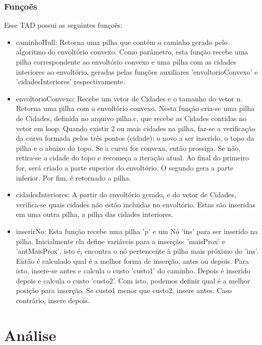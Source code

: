 \documentclass[a4paper,10pt]{article}
\begin{document}
  \subsubsection{Funço\~es}
  Esse TAD possui as seguintes funço\~es:
  
   \begin{itemize}

\item caminhoHull: Retorna uma pilha que contém o caminho gerado pelo algoritmo do envoltório convexo. Como parâmetro, esta função recebe uma pilha correspondente ao envoltório convexo e uma pilha com as cidades interiores ao envoltório, geradas pelas funções auxiliares 'envoltorioConvexo' e 'cidadesInteriores' respectivamente.

\item envoltorioConvexo: Recebe um vetor de Cidades e o tamanho do vetor n. Retorna uma pilha com o envoltório convexo. Nesta função cria-se uma pilha de Cidades, definida no arquivo pilha.c, que recebe as Cidades contidas no vetor em loop. Quando existir 2 ou mais cidades na pilha, faz-se a verificação da curva formada pelos três pontos (cidade): o novo a ser inserido, o topo da pilha e o abaixo do topo. Se a curva for convexa, então prossiga. Se não, retira-se a cidade do topo e recomeça a iteração atual. Ao final do primeiro for, será criado a parte superior do envoltório. O segundo gera a parte inferior. Por fim, é retornado a pilha.

\item cidadesInteriores: A partir do envoltório gerado, e do vetor de Cidades, verifica-se quais cidades não estão incluidas no envoltório. Estas são inseridas em uma outra pilha, a pilha das cidades interiores.

\item inserirNo: Esta função recebe uma pilha 'p' e um Nó 'ins' para ser inserido na pilha. Inicialmente ela define variáveis para a inserção: 'maisProx' e 'antMaisProx', isto é, encontra o nó pertencente à pilha mais próximo do 'ins'. Então é calculado qual é a melhor forma de inserção, antes ou depois. Para isto, insere-se antes e calcula o custo 'custo1' do caminho. Depois é inserido depois e calcula o custo 'custo2'. Com isto, podemos definir qual é a melhor posição para inserção. Se custo1 menor que custo2, insere antes. Caso contrário, insere depois.
\end{itemize}

 \section{Análise}
\end{document}
